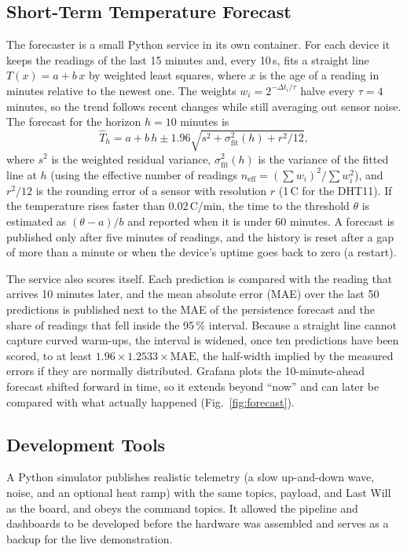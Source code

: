 \documentclass[conference]{IEEEtran}
\begin{document}
\subsection{Short-Term Temperature Forecast}
\label{sec:forecast}
The forecaster is a small Python service in its own container. For each device it keeps
the readings of the last 15 minutes and, every 10\,s, fits a straight line
$T(x) = a + b\,x$ by weighted least squares, where $x$ is the age of a reading in minutes
relative to the newest one. The weights $w_i = 2^{-\Delta t_i/\tau}$ halve every
$\tau = 4$ minutes, so the trend follows recent changes while still averaging out sensor
noise. The forecast for the horizon $h = 10$ minutes is
\begin{equation}
  \hat{T}_{h} = a + b\,h \pm 1.96\sqrt{s^2 + \sigma^2_{\mathrm{fit}}(h) + r^2/12},
\end{equation}
where $s^2$ is the weighted residual variance, $\sigma^2_{\mathrm{fit}}(h)$ is the variance of
the fitted line at $h$ (using the effective number of readings
$n_{\mathrm{eff}} = (\sum w_i)^2 / \sum w_i^2$), and $r^2/12$ is the rounding error of a sensor
with resolution $r$ (1\,\textdegree C for the DHT11). If the temperature rises faster than
0.02\,\textdegree C/min, the time to the threshold $\theta$ is estimated as $(\theta - a)/b$ and
reported when it is under 60 minutes. A forecast is published only after five minutes of
readings, and the history is reset after a gap of more than a minute or when the device's
uptime goes back to zero (a restart).

The service also scores itself. Each prediction is compared with the reading that
arrives 10 minutes later, and the mean absolute error (MAE) over the last 50 predictions is
published next to the MAE of the persistence forecast and the share of readings that fell
inside the 95\,\% interval. Because a straight line cannot capture curved warm-ups, the
interval is widened, once ten predictions have been scored, to at least
$1.96 \times 1.2533 \times \mathrm{MAE}$, the half-width implied by the measured errors if they
are normally distributed. Grafana plots the 10-minute-ahead forecast shifted forward in time, so
it extends beyond ``now'' and can later be compared with what actually happened
(Fig.~\ref{fig:forecast}).

\subsection{Development Tools}
A Python simulator publishes realistic telemetry (a slow up-and-down wave, noise, and
an optional heat ramp) with the same topics, payload, and Last Will as the board, and obeys the
command topics. It allowed the pipeline and dashboards to be developed before the
hardware was assembled and serves as a backup for the live demonstration.
\end{document}
